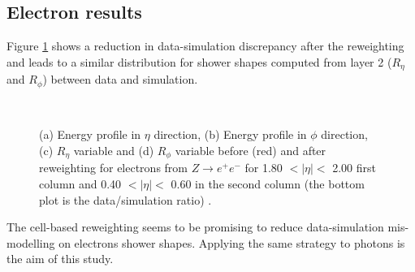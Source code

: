 \subsection{Electron results}
Figure \ref{fig:gamma:ss:reweighting:electron} shows a reduction in data-simulation discrepancy after the reweighting and leads to a similar distribution for shower shapes computed from layer 2 ($R_{\eta}$ and $R_{\phi}$) between data and simulation.
\begin{figure}[htbp]
    \centering
     \\
    \caption{(a) Energy profile in $\eta$ direction, (b) Energy profile in $\phi$ direction, (c) $R_{\eta}$ variable and (d) $R_{\phi}$ variable before (red) and after reweighting for electrons from $Z\rightarrow e^+e^-$ for 1.80 $ < |\eta| < $ 2.00 first column and 0.40 $ < |\eta| < $ 0.60 in the second column (the bottom plot is the data/simulation ratio) \cite{khandoga}.}
    \label{fig:gamma:ss:reweighting:electron}
\end{figure}
The cell-based reweighting seems to be promising to reduce data-simulation mis-modelling on electrons shower shapes. Applying the same strategy to photons is the aim of this study. 

